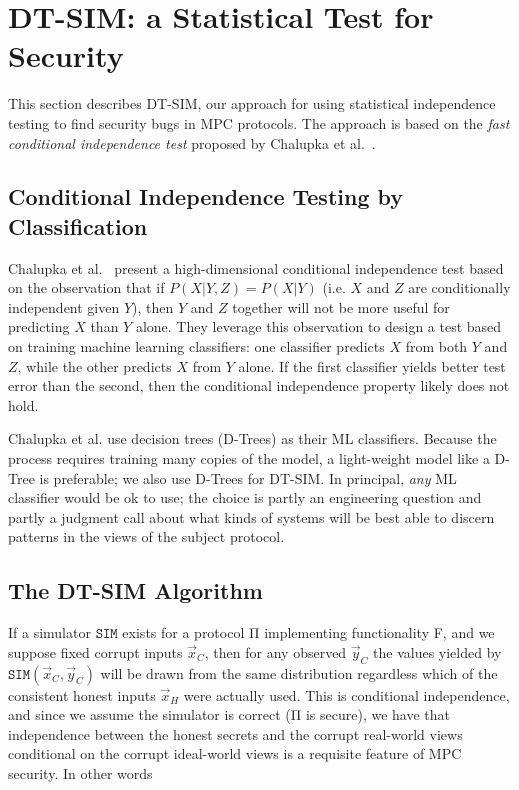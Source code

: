 \documentclass[compsoc, conference, a4paper, 10pt, times]{IEEEtran}
\newcommand{\toolname}{\textsc{DT-SIM}\xspace}
\begin{document}
\section{\toolname: a Statistical Test for Security}

This section describes \toolname, our approach for using statistical independence testing to find security bugs in MPC protocols. The approach is based on the \emph{fast conditional independence test} proposed by Chalupka et al.~\cite{chalupka2018fast}.

\subsection{Conditional Independence Testing by Classification}

Chalupka et al.~\cite{chalupka2018fast} present a high-dimensional conditional independence test based on the observation that if $P(X | Y, Z) = P(X | Y)$ (i.e. $X$ and $Z$ are conditionally independent given $Y$), then $Y$ and $Z$ together will not be more useful for predicting $X$ than $Y$ alone. They leverage this observation to design a test based on training machine learning classifiers: one classifier predicts $X$ from both $Y$ and $Z$, while the other predicts $X$ from $Y$ alone. If the first classifier yields better test error than the second, then the conditional independence property likely does not hold.

Chalupka et al. use decision trees (D-Trees) as their ML classifiers.
Because the process requires training many copies of the model, a light-weight model like a D-Tree is preferable;
we also use D-Trees for \toolname.
In principal, \textit{any} ML classifier would be ok to use; the choice is partly an engineering question
and partly a judgment call about what kinds of systems will be best able to discern patterns in the views of the subject protocol.

\subsection{The \toolname Algorithm}

If a simulator $\mathtt{SIM}$ exists for a protocol Π implementing functionality F,
and we suppose fixed corrupt inputs $\vec{x}_C$,
then for any observed $\vec{y}_C$ the values yielded by $\mathtt{SIM}(\vec{x}_C, \vec{y}_C)$
will be drawn from the same distribution regardless which of the consistent honest inputs $\vec{x}_H$ were actually used.
This is conditional independence, and since we assume the simulator is correct (Π is secure),
we have that independence between the honest secrets and the corrupt real-world views conditional on the corrupt ideal-world views
is a requisite feature of MPC security.
In other words
\end{document}
